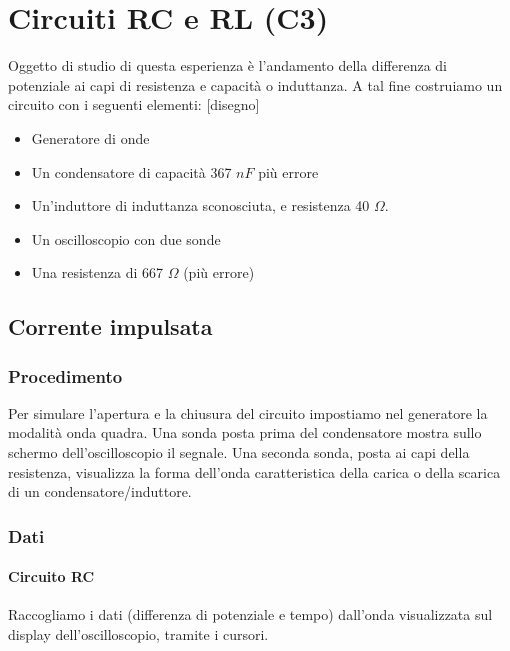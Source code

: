 \chapter{Circuiti RC e RL (C3)}

Oggetto di studio di questa esperienza è l'andamento della differenza di potenziale ai capi di resistenza e capacità o induttanza.
A tal fine costruiamo un circuito con i seguenti elementi:
[disegno]

\begin{itemize}
  \item Generatore di onde
  \item Un condensatore di capacità 367 $nF$ più errore
  \item Un'induttore di induttanza sconosciuta, e resistenza 40 $\Omega$.
  \item Un oscilloscopio con due sonde
  \item Una resistenza di 667 $\Omega$ (più errore)
\end{itemize}

\section{Corrente impulsata}
\subsection{Procedimento}


Per simulare l'apertura e la chiusura del circuito impostiamo nel generatore la modalità onda quadra. Una sonda posta prima del condensatore mostra sullo schermo dell'oscilloscopio il segnale.  
Una seconda sonda, posta ai capi della resistenza, visualizza la forma dell'onda caratteristica della carica o della scarica di un condensatore/induttore.

\subsection{Dati} 

\subsubsection{Circuito RC}

Raccogliamo i dati (differenza di potenziale e tempo) dall'onda visualizzata sul display dell'oscilloscopio, tramite i cursori. 

